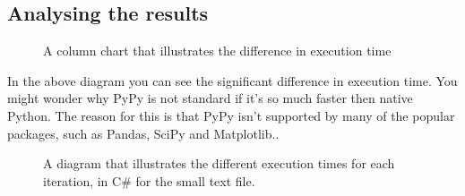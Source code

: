 \subsection{Analysing the results}


\begin{figure}[H]
    \vspace*{-0.8cm}
    \caption{A column chart that illustrates the difference in execution time}
\end{figure}

In the above diagram you can see the significant difference in execution time. You might wonder why PyPy is not standard if it's so much faster then native Python. The reason for this is that PyPy isn't supported by many of the popular packages, such as Pandas, SciPy and Matplotlib.\cite{quora_pypy}.

\begin{figure}[H]
    \vspace*{-0.8cm}
    \caption{A diagram that illustrates the different execution times for each iteration, in C\# for the small text file.}
\end{figure}

